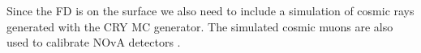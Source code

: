 


Since the FD is on the surface we also need to include a simulation of cosmic rays generated with the CRY \cite{CRY} MC generator. The simulated cosmic muons are also used to calibrate NOvA detectors \cite{NuMIFlux.pdf}. 

